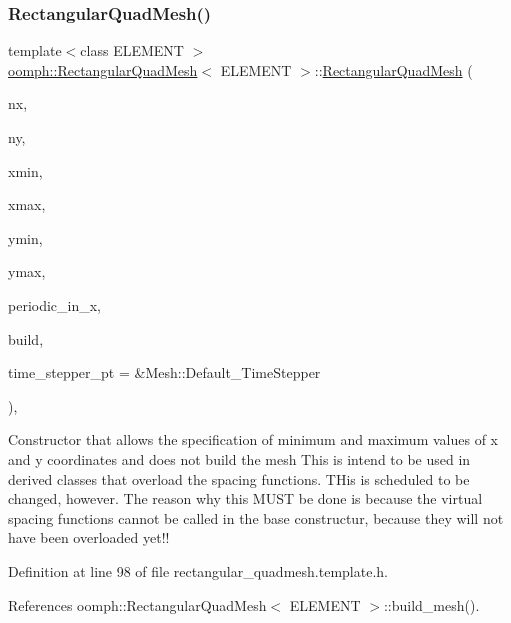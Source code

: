 \subsubsection{\texorpdfstring{Rectangular\+Quad\+Mesh()}{RectangularQuadMesh()}\hspace{0.1cm}{\footnotesize\ttfamily [1/5]}}
{\footnotesize\ttfamily template$<$class E\+L\+E\+M\+E\+NT $>$ \\
\hyperlink{classoomph_1_1RectangularQuadMesh}{oomph\+::\+Rectangular\+Quad\+Mesh}$<$ E\+L\+E\+M\+E\+NT $>$\+::\hyperlink{classoomph_1_1RectangularQuadMesh}{Rectangular\+Quad\+Mesh} (\begin{DoxyParamCaption}\item[{const unsigned \&}]{nx,  }\item[{const unsigned \&}]{ny,  }\item[{const double \&}]{xmin,  }\item[{const double \&}]{xmax,  }\item[{const double \&}]{ymin,  }\item[{const double \&}]{ymax,  }\item[{const bool \&}]{periodic\+\_\+in\+\_\+x,  }\item[{const bool \&}]{build,  }\item[{Time\+Stepper $\ast$}]{time\+\_\+stepper\+\_\+pt = {\ttfamily \&Mesh\+:\+:Default\+\_\+TimeStepper} }\end{DoxyParamCaption})\hspace{0.3cm}{\ttfamily [inline]}, {\ttfamily [protected]}}



Constructor that allows the specification of minimum and maximum values of x and y coordinates and does not build the mesh This is intend to be used in derived classes that overload the spacing functions. T\+His is scheduled to be changed, however. The reason why this M\+U\+ST be done is because the virtual spacing functions cannot be called in the base constructur, because they will not have been overloaded yet!! 



Definition at line 98 of file rectangular\+\_\+quadmesh.\+template.\+h.



References oomph\+::\+Rectangular\+Quad\+Mesh$<$ E\+L\+E\+M\+E\+N\+T $>$\+::build\+\_\+mesh().

\mbox{\label{classoomph_1_1RectangularQuadMesh_a1f906bca42da3d44765382013667e40d}} 
